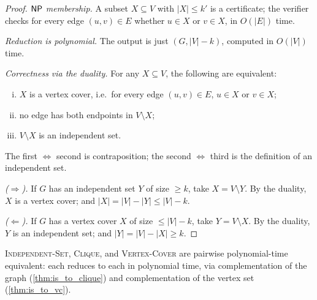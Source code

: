\begin{proof}
\textit{$\mathsf{NP}$ membership.} A subset $X \subseteq V$ with $|X| \le k'$ is a certificate; the verifier checks for every edge $(u, v) \in E$ whether $u \in X$ or $v \in X$, in $O(|E|)$ time.

\medskip
\noindent\textit{Reduction is polynomial.} The output is just $(G, |V| - k)$, computed in $O(|V|)$ time.

\medskip
\noindent\textit{Correctness via the duality.} For any $X \subseteq V$, the following are equivalent:
\begin{enumerate}[(i)]
  \item $X$ is a vertex cover, i.e.\ for every edge $(u, v) \in E$, $u \in X$ or $v \in X$;
  \item no edge has both endpoints in $V \setminus X$;
  \item $V \setminus X$ is an independent set.
\end{enumerate}
The first $\iff$ second is contraposition; the second $\iff$ third is the definition of an independent set.

\medskip
\noindent\textit{($\Rightarrow$).} If $G$ has an independent set $Y$ of size $\ge k$, take $X = V \setminus Y$. By the duality, $X$ is a vertex cover; and $|X| = |V| - |Y| \le |V| - k$.

\medskip
\noindent\textit{($\Leftarrow$).} If $G$ has a vertex cover $X$ of size $\le |V| - k$, take $Y = V \setminus X$. By the duality, $Y$ is an independent set; and $|Y| = |V| - |X| \ge k$.
\end{proof}

\begin{corollary}
\label{cor:is_clique_vc_equivalence}
\textsc{Independent-Set}, \textsc{Clique}, and \textsc{Vertex-Cover} are pairwise polynomial-time equivalent: each reduces to each in polynomial time, via complementation of the graph (\cref{thm:is_to_clique}) and complementation of the vertex set (\cref{thm:is_to_vc}).
\end{corollary}

